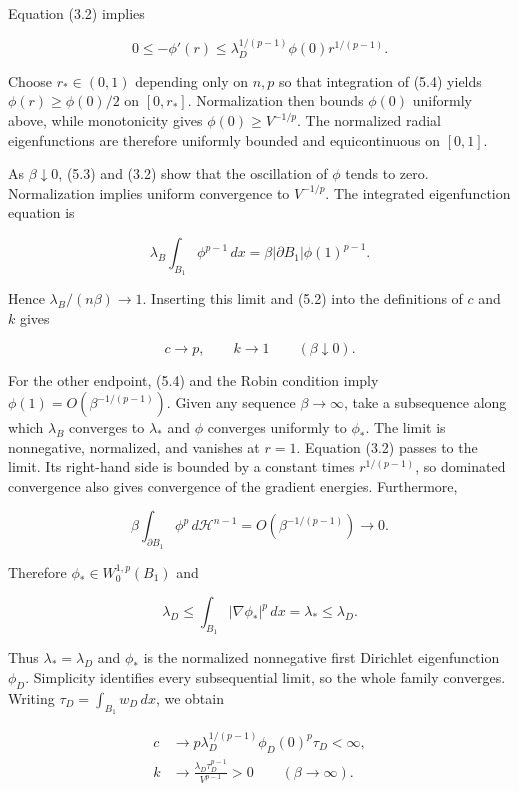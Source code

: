 \documentclass[11pt]{article}
\begin{document}
Equation (3.2) implies

\[0\leq-\phi'(r)\leq\lambda_D^{1/(p-1)}\phi(0)r^{1/(p-1)}.\tag{5.4}\]

Choose \(r_*\in(0,1)\) depending only on \(n,p\) so that integration of
(5.4) yields \(\phi(r)\geq\phi(0)/2\) on \([0,r_*]\). Normalization then
bounds \(\phi(0)\) uniformly above, while monotonicity gives
\(\phi(0)\geq V^{-1/p}\). The normalized radial eigenfunctions are
therefore uniformly bounded and equicontinuous on \([0,1]\).

As \(\beta\downarrow0\), (5.3) and (3.2) show that the oscillation of
\(\phi\) tends to zero. Normalization implies uniform convergence to
\(V^{-1/p}\). The integrated eigenfunction equation is

\[\lambda_B\int_{B_1}\phi^{p-1}\,dx
=\beta|\partial B_1|\phi(1)^{p-1}.\tag{5.5}\]

Hence \(\lambda_B/(n\beta)\to1\). Inserting this limit and (5.2) into
the definitions of \(c\) and \(k\) gives

\[c\longrightarrow p,\qquad k\longrightarrow1
\qquad(\beta\downarrow0).\tag{5.6}\]

For the other endpoint, (5.4) and the Robin condition imply
\(\phi(1)=O(\beta^{-1/(p-1)})\). Given any sequence \(\beta\to\infty\),
take a subsequence along which \(\lambda_B\) converges to \(\lambda_*\)
and \(\phi\) converges uniformly to \(\phi_*\). The limit is
nonnegative, normalized, and vanishes at \(r=1\). Equation (3.2) passes
to the limit. Its right-hand side is bounded by a constant times
\(r^{1/(p-1)}\), so dominated convergence also gives convergence of the
gradient energies. Furthermore,

\[\beta\int_{\partial B_1}\phi^p\,d\mathcal H^{n-1}
=O(\beta^{-1/(p-1)})\longrightarrow0.\]

Therefore \(\phi_*\in W^{1,p}_0(B_1)\) and

\[\lambda_D\leq\int_{B_1}|\nabla\phi_*|^p\,dx
=\lambda_*\leq\lambda_D.\]

Thus \(\lambda_*=\lambda_D\) and \(\phi_*\) is the normalized
nonnegative first Dirichlet eigenfunction \(\phi_D\). Simplicity
identifies every subsequential limit, so the whole family converges.
Writing \(\tau_D=\int_{B_1}w_D\,dx\), we obtain

\[\begin{aligned}
c&\longrightarrow p\lambda_D^{1/(p-1)}\phi_D(0)^p\tau_D<\infty,\\
k&\longrightarrow\frac{\lambda_D\tau_D^{p-1}}{V^{p-1}}>0
\qquad(\beta\to\infty).
\end{aligned}\tag{5.7}\]
\end{document}
